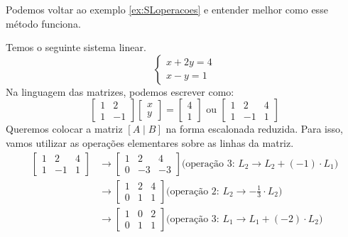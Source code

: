 \documentclass[../main.tex]{subfiles}
\begin{document}
			
			Podemos voltar ao exemplo \ref{ex:SLoperacoes} e entender melhor como esse método funciona.
			\begin{exemplo}
				Temos o seguinte sistema linear.
				\[
				\begin{cases}
					x+2y=4\\
					x-y=1
				\end{cases}
				\]
				Na linguagem das matrizes, podemos escrever como:
				\[
				\begin{bmatrix}
					1 & 2 \\
					1 & -1
				\end{bmatrix}
				\begin{bmatrix}
					x\\
					y
				\end{bmatrix}
				=
				\begin{bmatrix}
					4\\
					1
				\end{bmatrix}
				\text{ ou }
				\begin{bmatrix}
					1 & 2 & 4\\
					1 & -1 & 1
				\end{bmatrix}
				\]
				Queremos colocar a matriz $[A\mid B]$ na forma escalonada reduzida. Para isso, vamos utilizar as operações elementares sobre as linhas da matriz.
				\begin{align*}
					\begin{bmatrix}
						1 & 2 & 4\\
						1 & -1 & 1
					\end{bmatrix}
					& \rightarrow \begin{bmatrix}
						1 & 2 & 4\\
						0 & -3 & -3
					\end{bmatrix} \text{(operação 3: $L_2\to L_2+(-1)\cdot L_1$)}\\
					& \rightarrow \begin{bmatrix}
						1 & 2 & 4\\
						0 & 1 & 1
					\end{bmatrix} \text{(operação 2: $L_2\to -\frac{1}{3}\cdot L_2$)}\\
					& \rightarrow \begin{bmatrix}
						1 & 0 & 2\\
						0 & 1 & 1
					\end{bmatrix} \text{(operação 3: $L_1\to L_1+(-2)\cdot L_2$)}
				\end{align*}
				

\end{exemplo}
\end{document}
